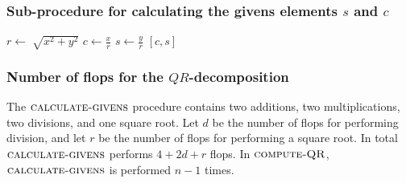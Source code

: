 \subsubsection*{Sub-procedure for calculating the givens elements $s$ and $c$}
\begin{algorithmic}
\State $r \gets \sqrt[]{x^2+y^2 }$ 
\State $c \gets \frac{x}{r} $
\State $s \gets \frac{y}{r} $
\State \Return $[c, s]$
\EndFunction
\end{algorithmic}

\subsubsection*{Number of flops for the $QR$-decomposition}
The $\textsc{calculate-givens}$ procedure contains two additions, two multiplications, two divisions, and one square root. 
Let $d$ be the number of flops for performing division, and let $r$ be the number of flops for performing a square root. 
In total $\textsc{calculate-givens}$ performs $4+2d+r$ flops. In $\textsc{compute-QR}$, $\textsc{calculate-givens}$ is performed $n-1$ times. 




